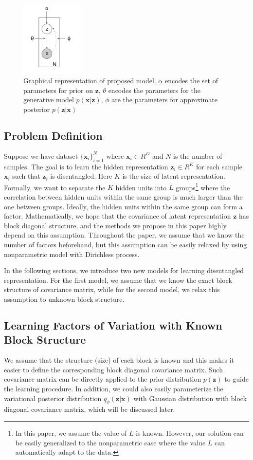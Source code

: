 
\begin{figure}[hb]
  \centering
  \includegraphics[width=1.2in]{images/model.png}
  \caption[]
   {Graphical representation of proposed model. $\alpha$ encodes the set of parameters for prior on $\mathbf{z}$, $\theta$ encodes the parameters for the generative model $p(\mathbf{x}|\mathbf{z})$, $\phi$ are the parameters for approximate posterior $p(\mathbf{z}|\mathbf{x})$}
  \label{fig:model}
\end{figure}

\subsection{Problem Definition}
Suppose we have dataset $\{\mathbf{x}_i\}_{i=1}^{N}$ where $\mathbf{x}_i\in R^D$ and $N$ is the number of samples. The goal is to learn the hidden representation $\mathbf{z}_i\in R^K$ for each sample $\mathbf{x}_i$ such that $\mathbf{z}_i$ is disentangled. Here $K$ is the size of latent representation.
Formally, we want to separate the $K$ hidden units into $L$ groups\footnote{In this paper, we assume the value of $L$ is known. However, our solution can be easily generalized to the nonparametric case where the value $L$ can automatically adapt to the data.} where the correlation between hidden units within the same group is much larger than the one between groups. Ideally, the hidden units within the same group can form a factor.
Mathematically, we hope that the covariance of latent representation $\mathbf{z}$ has block diagonal structure, and the methods we propose in this paper highly depend on this assumption. Throughout the paper, we assume that we know the number of factors beforehand, but this assumption can be easily relaxed by using nonparametric model with Dirichless process.

In the following sections, we introduce two new models for learning disentangled representation. For the first model, we assume that we know the exact block structure of covariance matrix, while for the second model, we relax this assumption to unknown block structure.

\subsection{Learning Factors of Variation with Known Block Structure}
We assume that the structure (size) of each block is known and this makes it easier to define the corresponding block diagonal covariance matrix. Such covariance matrix can be directly applied to the prior distribution $p(\mathbf{z})$ to guide the learning procedure. In addition, we could also easily parameterize the variational posterior distribution $q_{\phi}(\mathbf{z}|\mathbf{x})$ with Gaussian distribution with block diagonal covariance matrix, which will be discussed later.

